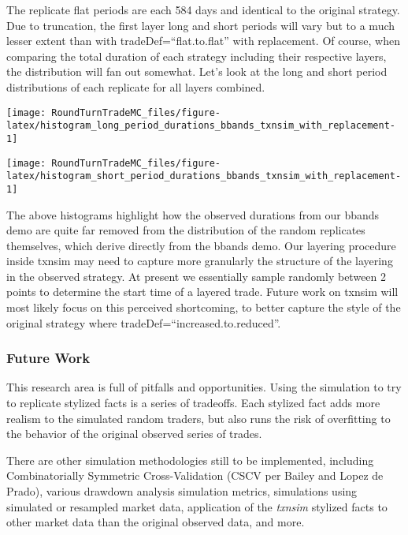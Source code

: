 The replicate flat periods are each 584 days and identical to the
original strategy. Due to truncation, the first layer long and short
periods will vary but to a much lesser extent than with
tradeDef=``flat.to.flat'' with replacement. Of course, when comparing
the total duration of each strategy including their respective layers,
the distribution will fan out somewhat. Let's look at the long and short
period distributions of each replicate for all layers combined.

\begin{Schunk}

\texttt{[image: RoundTurnTradeMC\_files/figure-latex/histogram\_long\_period\_durations\_bbands\_txnsim\_with\_replacement-1]} \end{Schunk}

\begin{Schunk}

\texttt{[image: RoundTurnTradeMC\_files/figure-latex/histogram\_short\_period\_durations\_bbands\_txnsim\_with\_replacement-1]} \end{Schunk}

The above histograms highlight how the observed durations from our
bbands demo are quite far removed from the distribution of the random
replicates themselves, which derive directly from the bbands demo. Our
layering procedure inside txnsim may need to capture more granularly the
structure of the layering in the observed strategy. At present we
essentially sample randomly between 2 points to determine the start time
of a layered trade. Future work on txnsim will most likely focus on this
perceived shortcoming, to better capture the style of the original
strategy where tradeDef=``increased.to.reduced''.

\hypertarget{future-work}{%
\subsubsection{Future Work}\label{future-work}}

This research area is full of pitfalls and opportunities. Using the
simulation to try to replicate stylized facts is a series of tradeoffs.
Each stylized fact adds more realism to the simulated random traders,
but also runs the risk of overfitting to the behavior of the original
observed series of trades.

There are other simulation methodologies still to be implemented,
including Combinatorially Symmetric Cross-Validation (CSCV per Bailey
and Lopez de Prado), various drawdown analysis simulation metrics,
simulations using simulated or resampled market data, application of the
\emph{txnsim} stylized facts to other market data than the original
observed data, and more.

